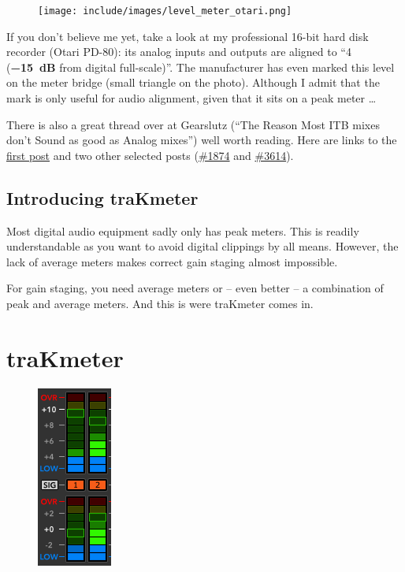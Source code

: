 \begin{figure}
\texttt{[image: include/images/level\_meter\_otari.png]}
\end{figure}

If you don't believe me yet, take a look at my professional 16-bit
hard disk recorder (Otari PD-80): its analog inputs and outputs are
aligned to ``\SI[addsign=all]{+4}{\dBu} (\textbf{\SI{-15}{\dB}} from
digital full-scale)''.  The manufacturer has even marked this level on
the meter bridge (small triangle on the photo).  Although I admit that
the mark is only useful for audio alignment, given that it sits on a
peak meter \dots

There is also a great thread over at Gearslutz (``The Reason Most ITB
mixes don’t Sound as good as Analog mixes'') well worth reading.  Here
are links to the
\href{http://www.gearslutz.com/board/5062929-post1.html}{first post}
and two other selected posts
(\href{http://www.gearslutz.com/board/5064831-post1874.html}{\#1874}
and
\href{http://www.gearslutz.com/board/5609740-post3614.html}{\#3614}).

\section{Introducing traKmeter}
\label{sec:introducing_trakmeter}

Most digital audio equipment sadly only has peak meters.  This is
readily understandable as you want to avoid digital clippings by all
means.  However, the lack of average meters makes correct gain staging
almost impossible.

For gain staging, you need average meters or -- even better -- a
combination of peak and average meters.  And this is were traKmeter
comes in.

\chapter{traKmeter}
\label{chap:trakmeter}

\begin{figure}
\includegraphics[scale=\screenshotscale,clip]{include/images/level_meter_complete.png}
\end{figure}

